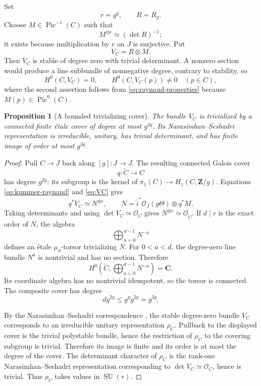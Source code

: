 \documentclass[11pt,reqno]{amsart}
\numberwithin{equation}{section}
\newtheorem{proposition}[theorem]{Proposition}
\theoremstyle{definition}
\theoremstyle{remark}
\newcommand{\C}{\mathbf C}
\newcommand{\Z}{\mathbf Z}
\newcommand{\OO}{\mathcal O}
\newcommand{\Pic}{\operatorname{Pic}}
\newcommand{\SU}{\operatorname{SU}}
\begin{document}
Set
\[
r=g^g,
\qquad R=R_g.
\]
Choose $M\in\Pic^{-1}(C)$ such that
\begin{equation}\label{eq:det-root}
M^{\otimes r}\simeq(\det R)^{-1};
\end{equation}
it exists because multiplication by $r$ on $J$ is surjective.  Put
\begin{equation}\label{eq:VC}
V_C=R\otimes M.
\end{equation}
Then $V_C$ is stable of degree zero with trivial determinant.  A nonzero section would produce a line subbundle of nonnegative degree, contrary to stability, so
\begin{equation}\label{eq:VC-properties}
H^0(C,V_C)=0,
\qquad
H^0(C,V_C(p))\ne0\quad(p\in C),
\end{equation}
where the second assertion follows from \eqref{eq:raynaud-properties} because $M(p)\in\Pic^0(C)$.

\begin{proposition}[A bounded trivializing cover]\label{prop:trivializing-cover}
The bundle $V_C$ is trivialized by a connected finite \'etale cover of degree at most $g^{3g}$.  Its Narasimhan--Seshadri representation is irreducible, unitary, has trivial determinant, and has finite image of order at most $g^{3g}$.
\end{proposition}

\begin{proof}
Pull $C\to J$ back along $[g]:J\to J$.  The resulting connected Galois cover
\[
q:\widetilde C\longrightarrow C
\]
has degree $g^{2g}$: its subgroup is the kernel of
$\pi_1(C)\to H_1(C,\Z/g)$.  Equations \eqref{eq:kummer-raynaud} and \eqref{eq:VC} give
\[
q^*V_C\simeq N^{\oplus r},
\qquad
N=\widetilde i^*\OO_J(g\Theta)\otimes q^*M.
\]
Taking determinants and using $\det V_C\simeq\OO_C$ gives $N^{\otimes r}\simeq\OO_{\widetilde C}$.  If $d\mid r$ is the exact order of $N$, the algebra
\[
\bigoplus_{a=0}^{d-1}N^{-a}
\]
defines an \'etale $\mu_d$-torsor trivializing $N$.  For $0<a<d$, the degree-zero line bundle $N^a$ is nontrivial and has no section.  Therefore
\[
H^0\!\left(\widetilde C,\bigoplus_{a=0}^{d-1}N^{-a}\right)=\C.
\]
Its coordinate algebra has no nontrivial idempotent, so the torsor is connected.  The composite cover has degree
\[
d g^{2g}\le g^g g^{2g}=g^{3g}.
\]

By the Narasimhan--Seshadri correspondence \cite{NarasimhanSeshadri1965}, the stable degree-zero bundle $V_C$ corresponds to an irreducible unitary representation $\rho_C$.  Pullback to the displayed cover is the trivial polystable bundle, hence the restriction of $\rho_C$ to the covering subgroup is trivial.  Therefore its image is finite and its order is at most the degree of the cover.  The determinant character of $\rho_C$ is the rank-one Narasimhan--Seshadri representation corresponding to $\det V_C\simeq\OO_C$, hence is trivial.  Thus $\rho_C$ takes values in $\SU(r)$.
\end{proof}
\end{document}
